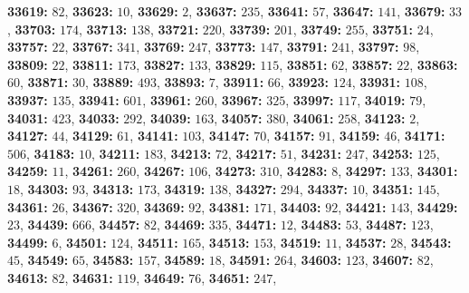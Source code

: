 \textsf{\bfseries 33619:} $82$, \textsf{\bfseries 33623:} $10$, \textsf{\bfseries 33629:} $2$, \textsf{\bfseries 33637:} $235$, \textsf{\bfseries 33641:} $57$, \textsf{\bfseries 33647:} $141$, \textsf{\bfseries 33679:} $33$, \textsf{\bfseries 33703:} $174$, \textsf{\bfseries 33713:} $138$, \textsf{\bfseries 33721:} $220$, \textsf{\bfseries 33739:} $201$, \textsf{\bfseries 33749:} $255$, \textsf{\bfseries 33751:} $24$, \textsf{\bfseries 33757:} $22$, \textsf{\bfseries 33767:} $341$, \textsf{\bfseries 33769:} $247$, \textsf{\bfseries 33773:} $147$, \textsf{\bfseries 33791:} $241$, \textsf{\bfseries 33797:} $98$, \textsf{\bfseries 33809:} $22$, \textsf{\bfseries 33811:} $173$, \textsf{\bfseries 33827:} $133$, \textsf{\bfseries 33829:} $115$, \textsf{\bfseries 33851:} $62$, \textsf{\bfseries 33857:} $22$, \textsf{\bfseries 33863:} $60$, \textsf{\bfseries 33871:} $30$, \textsf{\bfseries 33889:} $493$, \textsf{\bfseries 33893:} $7$, \textsf{\bfseries 33911:} $66$, \textsf{\bfseries 33923:} $124$, \textsf{\bfseries 33931:} $108$, \textsf{\bfseries 33937:} $135$, \textsf{\bfseries 33941:} $601$, \textsf{\bfseries 33961:} $260$, \textsf{\bfseries 33967:} $325$, \textsf{\bfseries 33997:} $117$, \textsf{\bfseries 34019:} $79$, \textsf{\bfseries 34031:} $423$, \textsf{\bfseries 34033:} $292$, \textsf{\bfseries 34039:} $163$, \textsf{\bfseries 34057:} $380$, \textsf{\bfseries 34061:} $258$, \textsf{\bfseries 34123:} $2$, \textsf{\bfseries 34127:} $44$, \textsf{\bfseries 34129:} $61$, \textsf{\bfseries 34141:} $103$, \textsf{\bfseries 34147:} $70$, \textsf{\bfseries 34157:} $91$, \textsf{\bfseries 34159:} $46$, \textsf{\bfseries 34171:} $506$, \textsf{\bfseries 34183:} $10$, \textsf{\bfseries 34211:} $183$, \textsf{\bfseries 34213:} $72$, \textsf{\bfseries 34217:} $51$, \textsf{\bfseries 34231:} $247$, \textsf{\bfseries 34253:} $125$, \textsf{\bfseries 34259:} $11$, \textsf{\bfseries 34261:} $260$, \textsf{\bfseries 34267:} $106$, \textsf{\bfseries 34273:} $310$, \textsf{\bfseries 34283:} $8$, \textsf{\bfseries 34297:} $133$, \textsf{\bfseries 34301:} $18$, \textsf{\bfseries 34303:} $93$, \textsf{\bfseries 34313:} $173$, \textsf{\bfseries 34319:} $138$, \textsf{\bfseries 34327:} $294$, \textsf{\bfseries 34337:} $10$, \textsf{\bfseries 34351:} $145$, \textsf{\bfseries 34361:} $26$, \textsf{\bfseries 34367:} $320$, \textsf{\bfseries 34369:} $92$, \textsf{\bfseries 34381:} $171$, \textsf{\bfseries 34403:} $92$, \textsf{\bfseries 34421:} $143$, \textsf{\bfseries 34429:} $23$, \textsf{\bfseries 34439:} $666$, \textsf{\bfseries 34457:} $82$, \textsf{\bfseries 34469:} $335$, \textsf{\bfseries 34471:} $12$, \textsf{\bfseries 34483:} $53$, \textsf{\bfseries 34487:} $123$, \textsf{\bfseries 34499:} $6$, \textsf{\bfseries 34501:} $124$, \textsf{\bfseries 34511:} $165$, \textsf{\bfseries 34513:} $153$, \textsf{\bfseries 34519:} $11$, \textsf{\bfseries 34537:} $28$, \textsf{\bfseries 34543:} $45$, \textsf{\bfseries 34549:} $65$, \textsf{\bfseries 34583:} $157$, \textsf{\bfseries 34589:} $18$, \textsf{\bfseries 34591:} $264$, \textsf{\bfseries 34603:} $123$, \textsf{\bfseries 34607:} $82$, \textsf{\bfseries 34613:} $82$, \textsf{\bfseries 34631:} $119$, \textsf{\bfseries 34649:} $76$, \textsf{\bfseries 34651:} $247$, 
